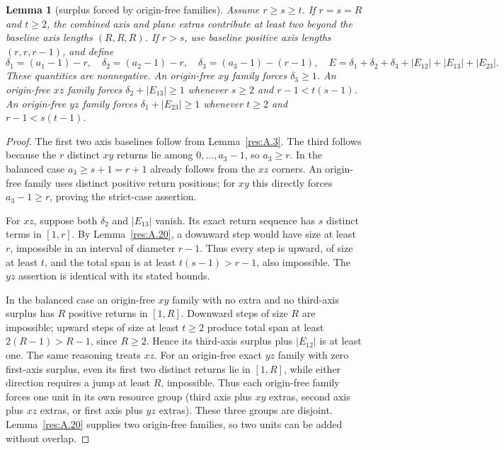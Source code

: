 \documentclass[11pt]{article}
\newtheorem{lemma}[theorem]{Lemma}
\theoremstyle{definition}
\theoremstyle{remark}
\theoremstyle{plain}
\begin{document}
\begin{lemma}[surplus forced by origin-free families]\label{res:A.21} Assume \(r\ge s\ge t\).
If \(r=s=R\) and \(t\ge2\), the combined axis and plane extras contribute at least two beyond the baseline axis lengths \((R,R,R)\).
If \(r>s\), use baseline positive axis lengths \((r,r,r-1)\), and define
\[
\delta_1=(a_1-1)-r,\quad\delta_2=(a_2-1)-r,
\quad\delta_3=(a_3-1)-(r-1),
\quad E=\delta_1+\delta_2+\delta_3+|E_{12}|+|E_{13}|+|E_{23}|.
\]
These quantities are nonnegative. An origin-free \(xy\) family forces \(\delta_3\ge1\). An origin-free \(xz\) family forces \(\delta_2+|E_{13}|\ge1\) whenever \(s\ge2\) and \(r-1<t(s-1)\). An origin-free \(yz\) family forces \(\delta_1+|E_{23}|\ge1\) whenever \(t\ge2\) and \(r-1<s(t-1)\).
\end{lemma}
\begin{proof} The first two axis baselines follow from Lemma~\ref{res:A.3}. The third follows because the \(r\) distinct \(xy\) returns lie among \(0,\ldots,a_3-1\), so \(a_3\ge r\). In the balanced case \(a_3\ge s+1=r+1\) already follows from the \(xz\) corners. An origin-free family uses distinct positive return positions; for \(xy\) this directly forces \(a_3-1\ge r\), proving the strict-case assertion.

For \(xz\), suppose both \(\delta_2\) and \(|E_{13}|\) vanish. Its exact return sequence has \(s\) distinct terms in \([1,r]\). By Lemma~\ref{res:A.20}, a downward step would have size at least \(r\), impossible in an interval of diameter \(r-1\). Thus every step is upward, of size at least \(t\), and the total span is at least \(t(s-1)>r-1\), also impossible. The \(yz\) assertion is identical with its stated bounds.

In the balanced case an origin-free \(xy\) family with no extra and no third-axis surplus has \(R\) positive returns in \([1,R]\). Downward steps of size \(R\) are impossible; upward steps of size at least \(t\ge2\) produce total span at least \(2(R-1)>R-1\), since \(R\ge2\). Hence its third-axis surplus plus \(|E_{12}|\) is at least one. The same reasoning treats \(xz\). For an origin-free exact \(yz\) family with zero first-axis surplus, even its first two distinct returns lie in \([1,R]\), while either direction requires a jump at least \(R\), impossible. Thus each origin-free family forces one unit in its own resource group (third axis plus \(xy\) extras, second axis plus \(xz\) extras, or first axis plus \(yz\) extras). These three groups are disjoint. Lemma~\ref{res:A.20} supplies two origin-free families, so two units can be added without overlap. \end{proof}
\end{document}
